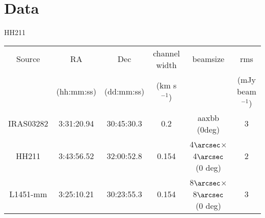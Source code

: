 \section{Data}

HH211

\cite{Tanner_2010}
\cite{Pineda_2011}
\cite{Tobin_2011}

\begin{table} 
    \begin{tabular}{ c c c c c c }
        Source & RA & Dec & channel width & beamsize & rms \\ 
         & (hh:mm:ss) & (dd:mm:ss) & (km s$^{-1}$) &  & (mJy beam$^{-1}$) \\ 
        IRAS03282 & 3:31:20.94 & 30:45:30.3 & 0.2 & aaxbb (0deg) & 3 \\ 
        HH211 & 3:43:56.52 & 32:00:52.8 & 0.154 & 4$\arcsec$$\times$4$\arcsec$ (0 deg) & 2 \\ 
        L1451-mm & 3:25:10.21 & 30:23:55.3 & 0.154 & 8$\arcsec$$\times$8$\arcsec$ (0 deg) & 3 \\ 
    \end{tabular} 
\end{table}
  
